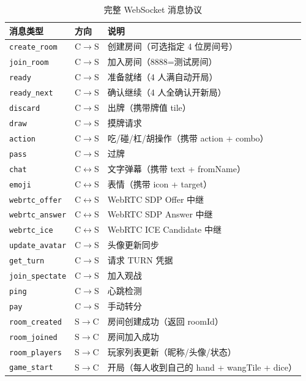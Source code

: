 \documentclass[11pt,a4paper]{article}
\begin{document}
\begin{table}[H]
\centering
\caption{完整 WebSocket 消息协议}
\label{tab:proto}
\footnotesize
\begin{tabular}{@{}llp{5cm}@{}}
\toprule
\textbf{消息类型} & \textbf{方向} & \textbf{说明} \\
\midrule
\texttt{create\_room}    & C$\to$S & 创建房间（可选指定 4 位房间号） \\
\texttt{join\_room}      & C$\to$S & 加入房间（8888=测试房间） \\
\texttt{ready}           & C$\to$S & 准备就绪（4 人满自动开局） \\
\texttt{ready\_next}     & C$\to$S & 确认继续（4 人全确认开新局） \\
\texttt{discard}         & C$\to$S & 出牌（携带牌值 tile） \\
\texttt{draw}            & C$\to$S & 摸牌请求 \\
\texttt{action}          & C$\to$S & 吃/碰/杠/胡操作（携带 action + combo） \\
\texttt{pass}            & C$\to$S & 过牌 \\
\texttt{chat}            & C$\leftrightarrow$S & 文字弹幕（携带 text + fromName） \\
\texttt{emoji}           & C$\leftrightarrow$S & 表情（携带 icon + target） \\
\texttt{webrtc\_offer}   & C$\leftrightarrow$S & WebRTC SDP Offer 中继 \\
\texttt{webrtc\_answer}  & C$\leftrightarrow$S & WebRTC SDP Answer 中继 \\
\texttt{webrtc\_ice}     & C$\leftrightarrow$S & WebRTC ICE Candidate 中继 \\
\texttt{update\_avatar}   & C$\to$S & 头像更新同步 \\
\texttt{get\_turn}       & C$\to$S & 请求 TURN 凭据 \\
\texttt{join\_spectate}  & C$\to$S & 加入观战 \\
\texttt{ping}            & C$\to$S & 心跳检测 \\
\texttt{pay}             & C$\to$S & 手动转分 \\
\midrule
\texttt{room\_created}   & S$\to$C & 房间创建成功（返回 roomId） \\
\texttt{room\_joined}     & S$\to$C & 房间加入成功 \\
\texttt{room\_players}    & S$\to$C & 玩家列表更新（昵称/头像/状态） \\
\texttt{game\_start}      & S$\to$C & 开局（每人收到自己的 hand + wangTile + dice） \\

\end{tabular}
\end{table}
\end{document}

